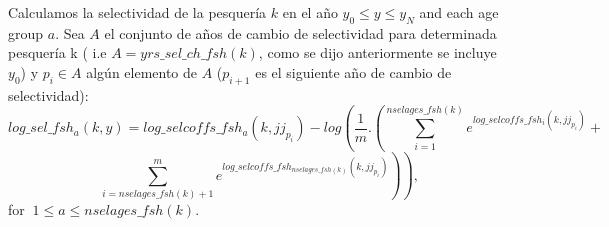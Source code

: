 \documentclass{article}
\begin{document}
\begin{itemize}



Calculamos la selectividad de la pesquería $k$ en el año $y_0\leq y \leq y_N$ and each age group $a$. Sea $A$ el conjunto de años de cambio de selectividad para determinada pesquería k ( i.e $A= yrs\_sel\_ch\_fsh(k)$, como se dijo anteriormente se incluye $y_0$) y $p_i\in A$  algún elemento de $A$ ($p_{i+1}$ es el siguiente año de cambio de selectividad):
 \begin{equation}
        log\_sel\_fsh_a(k,y)=log\_selcoffs\_fsh_a(k,jj_{p_i})-log\left(\dfrac{1}{m}.\left(\sum_{i=1}^{nselages\_fsh(k)}e^{log\_selcoffs\_fsh_i(k,jj_{p_i})}+\right.\right.
    \end{equation}
    \begin{equation*}
       \left. \left.\sum_{i=nselages\_fsh(k)+1}^{m}e^{log\_selcoffs\_fsh_{nselages\_fsh(k)}(k,jj_{p_i})}\right)\right), 
    \end{equation*}
   for $\ 1\leq a \leq nselages\_fsh(k)$.\\
   

\end{itemize}
\end{document}
